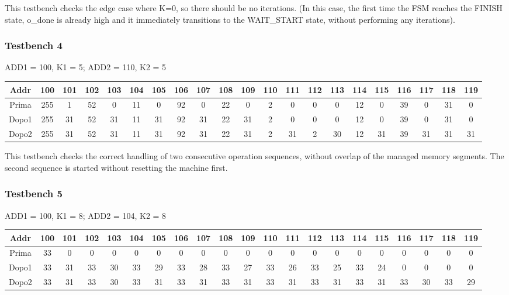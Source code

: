 \documentclass{article}
\begin{document}
This testbench checks the edge case where K=0, so there should be no iterations. (In this case, the first time the FSM reaches the FINISH state, o\_done is already high and it immediately transitions to the WAIT\_START state, without performing any iterations).

\subsubsection{Testbench 4}

ADD1 = 100, K1 = 5; ADD2 = 110, K2 = 5
\begin{table}[H]
    \begin{adjustwidth}{-1.75cm}{}
    \centering
    \begin{tabular}{|c|*{20}{c|}}
        \hline
        Addr & 100 & 101 & 102 & 103 & 104 & 105 & 106 & 107 & 108 & 109 & 110 & 111 & 112 & 113 & 114 & 115 & 116 & 117 & 118 & 119 \\
        \hline
        Prima & 255 & 1 & 52 & 0 & 11 & 0 & 92 & 0 & 22 & 0 & 2 & 0 & 0 & 0 & 12 & 0 & 39 & 0 & 31 & 0 \\
        Dopo1 & 255 & 31 & 52 & 31 & 11 & 31 & 92 & 31 & 22 & 31 & 2 & 0 & 0 & 0 & 12 & 0 & 39 & 0 & 31 & 0 \\
        Dopo2 & 255 & 31 & 52 & 31 & 11 & 31 & 92 & 31 & 22 & 31 & 2 & 31 & 2 & 30 & 12 & 31 & 39 & 31 & 31 & 31 \\
        \hline
    \end{tabular}
    \end{adjustwidth}
\end{table}

This testbench checks the correct handling of two consecutive operation sequences, without overlap of the managed memory segments. The second sequence is started without resetting the machine first.

\subsubsection{Testbench 5}

ADD1 = 100, K1 = 8; ADD2 = 104, K2 = 8
\begin{table}[H]
    \begin{adjustwidth}{-1.75cm}{}
    \centering
    \begin{tabular}{|c|*{20}{c|}}
        \hline
        Addr & 100 & 101 & 102 & 103 & 104 & 105 & 106 & 107 & 108 & 109 & 110 & 111 & 112 & 113 & 114 & 115 & 116 & 117 & 118 & 119 \\
        \hline
        Prima & 33 & 0 & 0 & 0 & 0 & 0 & 0 & 0 & 0 & 0 & 0 & 0 & 0 & 0 & 0 & 0 & 0 & 0 & 0 & 0 \\
        Dopo1 & 33 & 31 & 33 & 30 & 33 & 29 & 33 & 28 & 33 & 27 & 33 & 26 & 33 & 25 & 33 & 24 & 0 & 0 & 0 & 0 \\
        Dopo2 & 33 & 31 & 33 & 30 & 33 & 31 & 33 & 31 & 33 & 31 & 33 & 31 & 33 & 31 & 33 & 31 & 33 & 30 & 33 & 29 \\
        \hline
    \end{tabular}
    \end{adjustwidth}
\end{table}
\end{document}
